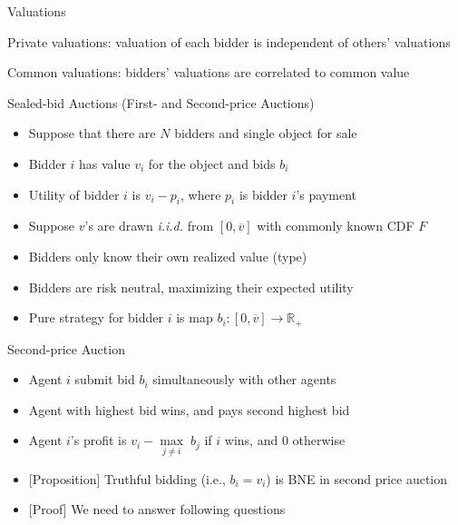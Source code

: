 \documentclass[11pt,aspectratio=169,handout]{beamer}
\begin{document}
  
  \begin{frame}{Valuations}
   \begin{itemizes}[2em]
    \item \alert{Private valuations}: valuation of each bidder is independent of others' valuations
    \item \alert{Common valuations}: bidders' valuations are correlated to common value
   \end{itemizes}
  \end{frame}


  \begin{frame}{Sealed-bid Auctions (First- and Second-price Auctions)}
   \begin{itemize}[<+->]
   \setlength{\itemsep}{0.5em}
    \item Suppose that there are $N$ bidders and single object for sale
    \item Bidder $i$ has value $v_i$ for the object and bids $b_i$
    \item Utility of bidder $i$ is $v_i - p_i$, where $p_i$ is bidder $i$'s payment
    \item Suppose $v$'s  are drawn \textit{i.i.d.} from $[0,\overline{v}]$ with commonly known CDF $F$
    \item Bidders only know their own realized value (type)
    \item Bidders are risk neutral, maximizing their expected utility
    \item Pure strategy for bidder $i$ is map $b_i:[0,\overline{v} ]\rightarrow \mathbb{R}_+$
   \end{itemize}
  \end{frame}


  \begin{frame}{Second-price Auction}
   \begin{itemize}[<+->]
   \setlength{\itemsep}{1em}
    \item Agent $i$ submit bid $b_i$ simultaneously with other agents
    \item Agent with highest bid wins, and pays second highest bid
    \item Agent $i$'s profit is $v_i - \underset{j\ne i}{\max} \; b_j$ if $i$ wins, and 0 otherwise
    \item \alert{[Proposition]} Truthful bidding (i.e., $b_i = v_i$) is BNE in second price auction
    \item \alert{[Proof]} We need to answer following questions
   \end{itemize}
  \end{frame}
\end{document}
